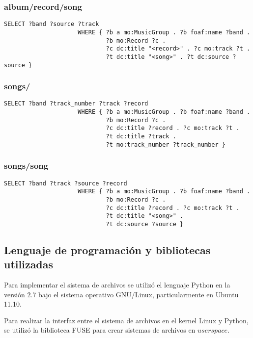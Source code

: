\documentclass[a4paper,oneside]{report}
\begin{document}
\subsubsection{album/record/song}

\begin{lstlisting}
SELECT ?band ?source ?track 
                     WHERE { ?b a mo:MusicGroup . ?b foaf:name ?band . 
                             ?b mo:Record ?c .
                             ?c dc:title "<record>" . ?c mo:track ?t .
                             ?t dc:title "<song>" . ?t dc:source ?source }
\end{lstlisting}

\subsubsection{songs/}

\begin{lstlisting}
SELECT ?band ?track_number ?track ?record 
                     WHERE { ?b a mo:MusicGroup . ?b foaf:name ?band . 
                             ?b mo:Record ?c .
                             ?c dc:title ?record . ?c mo:track ?t .
                             ?t dc:title ?track . 
                             ?t mo:track_number ?track_number }
\end{lstlisting}


\subsubsection{songs/song}

\begin{lstlisting}
SELECT ?band ?track ?source ?record 
                     WHERE { ?b a mo:MusicGroup . ?b foaf:name ?band . 
                             ?b mo:Record ?c .
                             ?c dc:title ?record . ?c mo:track ?t .
                             ?t dc:title "<song>" . 
                             ?t dc:source ?source }
\end{lstlisting}

\subsection{Lenguaje de programación y bibliotecas utilizadas}

Para implementar el sistema de archivos se utilizó el lenguaje Python en la versión 2.7 bajo el sistema operativo GNU/Linux, particularmente en Ubuntu 11.10.

Para realizar la interfaz entre el sistema de archivos en el kernel Linux y Python, se utilizó la biblioteca FUSE para crear sistemas de archivos en $userspace$.
\end{document}
